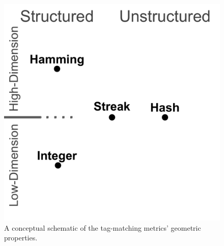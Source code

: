 \begin{figure}[!htbp]
\begin{center}

\includegraphics[width=0.5\columnwidth]{img/conceptual-geometry}
\caption{
A conceptual schematic of the tag-matching metrics' geometric properties.
}
\label{fig:conceptual_geometry}

\end{center}
\end{figure}
